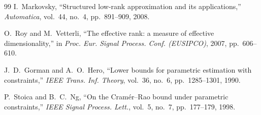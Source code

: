 \documentclass[journal]{IEEEtran}
\begin{document}
\begin{thebibliography}{99}
I.~Markovsky,
``Structured low-rank approximation and its applications,''
\emph{Automatica},
vol.~44, no.~4, pp.~891--909, 2008.

O.~Roy and M.~Vetterli,
``The effective rank: a measure of effective dimensionality,''
in \emph{Proc. Eur. Signal Process. Conf. (EUSIPCO)},
2007, pp.~606--610.

J.~D.~Gorman and A.~O.~Hero,
``Lower bounds for parametric estimation with constraints,''
\emph{IEEE Trans. Inf. Theory},
vol.~36, no.~6, pp.~1285--1301, 1990.

P.~Stoica and B.~C.~Ng,
``On the Cram\'er--Rao bound under parametric constraints,''
\emph{IEEE Signal Process. Lett.},
vol.~5, no.~7, pp.~177--179, 1998.

\end{thebibliography}
\end{document}
